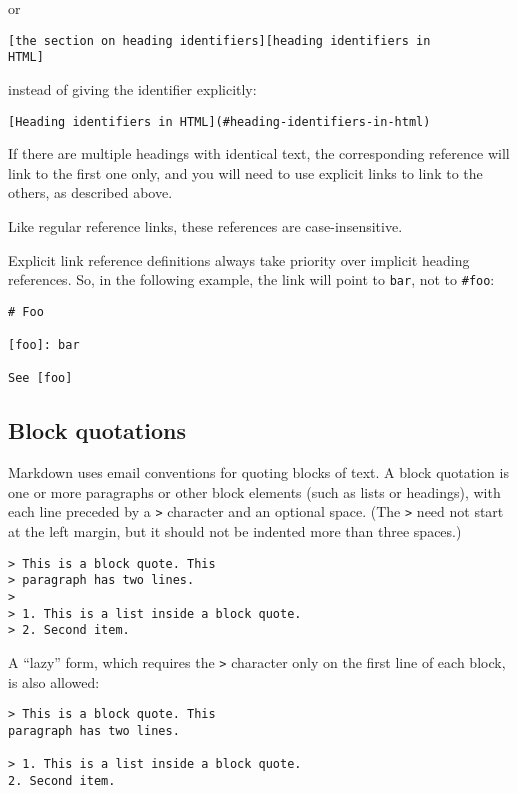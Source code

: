 \documentclass[
]{article}
\begin{document}
or

\begin{verbatim}
[the section on heading identifiers][heading identifiers in
HTML]
\end{verbatim}

instead of giving the identifier explicitly:

\begin{verbatim}
[Heading identifiers in HTML](#heading-identifiers-in-html)
\end{verbatim}

If there are multiple headings with identical text, the corresponding
reference will link to the first one only, and you will need to use
explicit links to link to the others, as described above.

Like regular reference links, these references are case-insensitive.

Explicit link reference definitions always take priority over implicit
heading references. So, in the following example, the link will point to
\texttt{bar}, not to \texttt{\#foo}:

\begin{verbatim}
# Foo

[foo]: bar

See [foo]
\end{verbatim}

\subsection{Block quotations}\label{block-quotations}

Markdown uses email conventions for quoting blocks of text. A block
quotation is one or more paragraphs or other block elements (such as
lists or headings), with each line preceded by a \texttt{\textgreater{}}
character and an optional space. (The \texttt{\textgreater{}} need not
start at the left margin, but it should not be indented more than three
spaces.)

\begin{verbatim}
> This is a block quote. This
> paragraph has two lines.
>
> 1. This is a list inside a block quote.
> 2. Second item.
\end{verbatim}

A ``lazy'' form, which requires the \texttt{\textgreater{}} character
only on the first line of each block, is also allowed:

\begin{verbatim}
> This is a block quote. This
paragraph has two lines.

> 1. This is a list inside a block quote.
2. Second item.
\end{verbatim}
\end{document}
